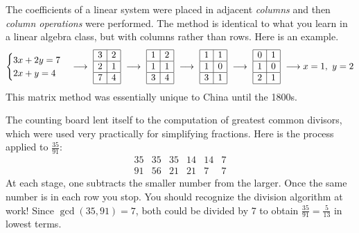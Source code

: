 The coefficients of a linear system were placed in adjacent \emph{columns} and then \emph{column operations} were performed. The method is identical to what you learn in a linear algebra class, but with columns rather than rows. Here is an example.
\[\begin{cases}
3x+2y=7\\
2x+y=4
\end{cases}\longrightarrow\ 
\begin{array}{|c|c|c|c|c|}
  \hline
  3&2\\\hline
  2&1\\\hline
  7&4\\\hline
  \end{array}\ \longrightarrow\ 
\begin{array}{|c|c|c|c|c|}
  \hline
  1&2\\\hline
  1&1\\\hline
  3&4\\\hline
  \end{array}\ \longrightarrow\ 
\begin{array}{|c|c|c|c|c|}
  \hline
  1&1\\\hline
  1&0\\\hline
  3&1\\\hline
  \end{array}\ \longrightarrow\ 
\begin{array}{|c|c|c|c|c|}
  \hline
  0&1\\\hline
  1&0\\\hline
  2&1\\\hline
  \end{array}\ \longrightarrow x=1,\ y=2\]
This matrix method was essentially unique to China until the 1800s.


\boldinline{Euclidean algorithm}

The counting board lent itself to the computation of greatest common divisors, which were used very practically for simplifying fractions. Here is the process applied to $\frac{35}{91}$:
\[\begin{array}{llllllll}
35&35&35&14&14&7\\
91&56&21&21&7&7
\end{array}\]
At each stage, one subtracts the smaller number from the larger. Once the same number is in each row you stop. You should recognize the division algorithm at work! Since $\gcd(35,91)=7$, both could be divided by 7 to obtain $\frac{35}{91}=\frac 5{13}$ in lowest terms.



